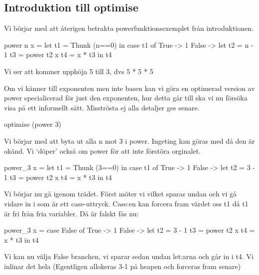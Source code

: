 \documentclass[../Optimise]{subfiles}
\begin{document}
\subsection{Introduktion till optimise}

Vi börjar med att återigen betrakta powerfunktionsexemplet från introduktionen.

\begin{codeEx}
power n x = let t1 = Thunk (n==0)
              in case t1 of
                      True -> 1
                      False -> let t2 = n - 1 
                                   t3 = power t2 x
                                   t4 = x * t3
                                in t4
\end{codeEx}
Vi ser att  kommer upphöja 5 till 3, dvs 5 * 5 * 5

Om vi känner till exponenten men inte basen kan vi göra en optimerad version av power
specialicerad för just den exponenten, hur detta går till ska vi nu försöka visa på ett 
informellt sätt. Misströsta ej alla detaljer ges senare.

\begin{codeEx}
optimise (power 3)
\end{codeEx}

Vi börjar med att byta ut alla n mot 3 i power. Ingeting kan göras med  då 
den är okänd. Vi `döper' också om power för att inte förstöra orginalet.
\begin{codeEx}
power_3 x = let t1 = Thunk (3==0)
               in case t1 of
                     True -> 1
                     False -> let t2 = 3 - 1 
                                  t3 = power t2 x
                                  t4 = x * t3
                               in t4
\end{codeEx}

Vi börjar nu gå igenom trädet. Först möter vi  vilket sparas undan och vi gå vidare in i  som är ett case-uttryck. Case:en kan forcera fram värdet oss t1 då t1 är fri från fria variabler. Då  är falskt fås nu: 

\begin{codeEx}
power_3 x = case False of
              True -> 1
              False -> let t2 = 3 - 1 
                           t3 = power t2 x
                           t4 = x * t3
                         in t4
\end{codeEx}

Vi kan nu välja False branchen, vi sparar sedan undan let:arna och går in i t4. Vi inlinar det hela
(Egentligen allokeras 3-1 på heapen och forceras fram senare)
\end{document}
